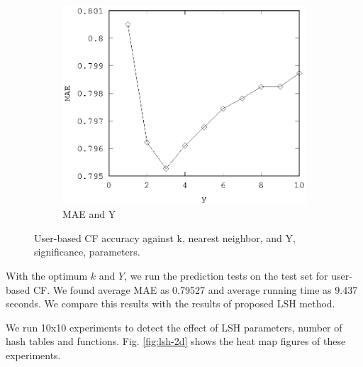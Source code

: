 \documentclass[conference]{IEEEtran}
\begin{document}
\begin{figure}
\begin{subfigure}[b]{0.225\textwidth}
                \includegraphics[width=\textwidth]{charts/ub-mae-y.eps}
                \caption{MAE and Y}
                \label{fig:mae-y-ub}
        \end{subfigure} 
        \caption{User-based CF accuracy against k, nearest neighbor, and Y, significance, parameters.}
        \label{fig:ub-parameters}
\end{figure}


With the optimum $k$ and $Y$,  we run the prediction tests on the test set for user-based CF. We found average MAE as 0.79527 and average running time as 9.437 seconds. We compare this results with the results of proposed LSH method.

We run 10x10 experiments to detect the effect of LSH parameters, number of hash tables and functions. Fig. \ref{fig:lsh-2d} shows the heat map figures of these experiments.
\end{document}
